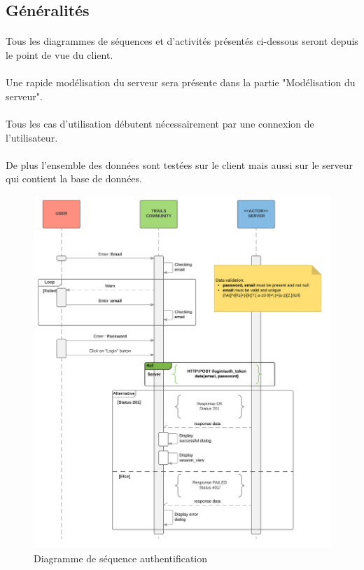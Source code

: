 \documentclass[titlepage, 12pt]{report}
\begin{document}
\subsection{Généralités}

\paragraph{}Tous les diagrammes de séquences et d'activités présentés ci-dessous seront depuis le point de vue du client.
\paragraph{}Une rapide modélisation du serveur sera présente dans la partie "Modélisation du serveur".
\paragraph{}Tous les cas d'utilisation débutent nécessairement par une connexion de l'utilisateur.
\paragraph{}De plus l'ensemble des données sont testées sur le client mais aussi sur le serveur qui contient la base de données.


\begin{figure}[!h]
	\caption{Diagramme de séquence authentification}
	\label{authentification_sequence_diagram}
	\centering
	\includegraphics[scale=0.7]{Images/diagram/login_sequence_diagram.png}
\end{figure}
\end{document}
